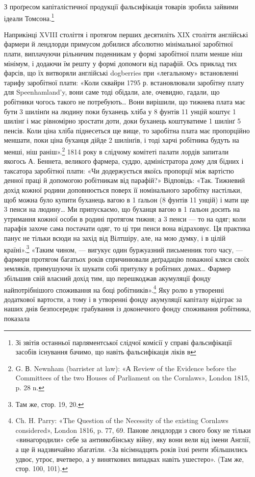 З проґресом капіталістичної продукції фальсифікація
товарів зробила зайвими ідеали Томсона.\footnote{
Зі звітів останньої парляментської слідчої комісії у справі фальсифікації
засобів існування бачимо, що навіть фальсифікація ліків в
}

Наприкінці XVIII століття і протягом перших десятиліть
XIX століття англійські фармери й лендлорди примусом добилися
абсолютно мінімальної заробітної плати, виплачуючи рільничим
поденникам у формі заробітної плати менше ніш мінімум,
і додаючи їм решту у формі допомоги від парафій. Ось приклад
тих фарсів, що їх витворяли англійські dogberries при «легальному»
встановленні тарифу заробітної плати: «Коли сквайри
1795 р. встановлювали заробітну плату для Speenhamland’y,
вони саме тоді обідали, але, очевидно, гадали, що робітники
чогось такого не потребують\dots{} Вони вирішили, що тижнева
плата має бути 3 шилінґи на людину поки буханець хліба
у 8 фунтів 11 унцій коштує 1 шилінґ і має рівномірно зростати
доти, доки буханець коштуватиме 1 шилінґ 5 пенсів.
Коли ціна хліба піднесеться ще вище, то заробітна плата
має пропорційно меншати, поки ціна буханця дійде 2 шилінґів,
і тоді харчі робітника будуть на  менші, ніш раніш».\footnote{
G. В. Newnham (barrister at law): «А Review of the Evidence
before the Committees of the two Houses of Parliament on the Cornlaws»,
London 1815, p. 28 n.
}
1814 року в слідчому комітеті палати лордів запитали якогось
А. Беннета, великого фармера, суддю, адміністратора дому для
бідних і таксатора заробітної плати: «Чи додержується якоїсь
пропорції між вартістю денної праці й допомогою робітникам
від парафій?» Відповідь: «Так. Тижневий дохід кожної родини
доповнюється поверх її номінального заробітку настільки, щоб
можна було купити буханець вагою в 1 ґальон (8 фунтів 11 унцій)
і мати ще 3 пенси на людину\dots{} Ми припускаємо, що буханця
вагою в 1 ґальон досить на утримання кожної особи в родині
протягом тижня; а 3 пенси — то на одяг; коли парафія захоче
сама постачати одяг, то ці три пенси вона відраховує. Ця практика
панує не тільки всюди на захід від Вілтшіру, але, на мою
думку, і в цілій країні».\footnote{
Там же, стор. 19, 20.
} «Таким чином, — вигукує один буржуазний
письменник того часу, — фармери протягом багатьох років
спричинювали деґрадацію поважної кляси своїх земляків, примушуючи
їх шукати собі притулку в робітних домах\dots{} Фармер
збільшив свій власний дохід тим, що перешкоджав акумуляції
фонду найпотрібнішого споживання на боці робітників».\footnote{
Ch. H. Parry: «The Question of the Necessity of the existing Cornlaws
considered», London 1816, p. 77, 69. Панове лендлорди з свого боку
не тільки «винагородили» себе за антиякобінську війну, яку вони вели
від імени Англії, а ще й надзвичайно збагатіли. «За вісімнадцять років
їхні ренти збільшились удвоє, утроє, вчетверо, а у виняткових випадках
навіть ушестеро». (Там же, стор. 100, 101).
} Яку
ролю в утворенні додаткової вартости, а тому і в утворенні
фонду акумуляції капіталу відіграє за наших днів безпосереднє
грабування із доконечного фонду споживання робітника, показала

